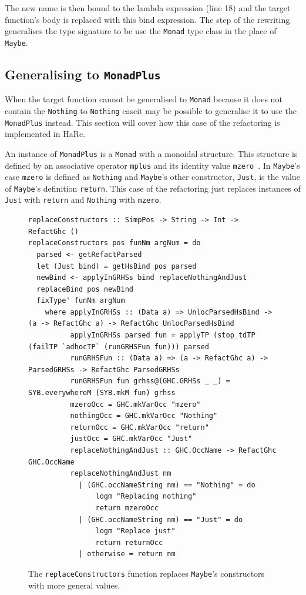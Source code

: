 The new name is then bound to the lambda expression (line 18) and the target function's body is replaced with this bind expression. The step of the rewriting generalises the type signature to be use the \texttt{Monad} type class in the place of \texttt{Maybe}.

\subsection{Generalising to \texttt{MonadPlus}}

When the target function cannot be generalised to \texttt{Monad} because it does not contain the \texttt{Nothing} to \texttt{Nothing} case\DIFaddbegin \DIFadd{, }\DIFaddend it may be possible to generalise it to use the \texttt{MonadPlus} \DIFdelbegin {}\DIFdelend \DIFaddbegin {}\DIFaddend instead. This section will cover how this case of the refactoring is implemented in HaRe.

An instance of \texttt{MonadPlus} is a \texttt{Monad} with a monoidal structure.
This structure is defined by an associative operator \texttt{mplus} and its identity value \texttt{mzero}~\citep{typeclassopedia}. 
In \texttt{Maybe}'s case \texttt{mzero} is defined as \texttt{Nothing} and \texttt{Maybe}'s other constructor, \texttt{Just}, is the value of \texttt{Maybe}'s definition \texttt{return}.
This case of the refactoring just replaces instances of \texttt{Just} with \texttt{return} and \texttt{Nothing} with \texttt{mzero}. 

\begin{figure}[t]
\begin{lstlisting}
replaceConstructors :: SimpPos -> String -> Int -> RefactGhc ()
replaceConstructors pos funNm argNum = do
  parsed <- getRefactParsed
  let (Just bind) = getHsBind pos parsed
  newBind <- applyInGRHSs bind replaceNothingAndJust
  replaceBind pos newBind
  fixType' funNm argNum
    where applyInGRHSs :: (Data a) => UnlocParsedHsBind -> (a -> RefactGhc a) -> RefactGhc UnlocParsedHsBind
          applyInGRHSs parsed fun = applyTP (stop_tdTP (failTP `adhocTP` (runGRHSFun fun))) parsed
          runGRHSFun :: (Data a) => (a -> RefactGhc a) -> ParsedGRHSs -> RefactGhc ParsedGRHSs
          runGRHSFun fun grhss@(GHC.GRHSs _ _) = SYB.everywhereM (SYB.mkM fun) grhss
          mzeroOcc = GHC.mkVarOcc "mzero"
          nothingOcc = GHC.mkVarOcc "Nothing"
          returnOcc = GHC.mkVarOcc "return"
          justOcc = GHC.mkVarOcc "Just"
          replaceNothingAndJust :: GHC.OccName -> RefactGhc GHC.OccName
          replaceNothingAndJust nm
            | (GHC.occNameString nm) == "Nothing" = do
                logm "Replacing nothing"
                return mzeroOcc
            | (GHC.occNameString nm) == "Just" = do
                logm "Replace just"
                return returnOcc            
            | otherwise = return nm
\end{lstlisting}
\caption{The \texttt{replaceConstructors} function replaces \texttt{Maybe}'s constructors with more general values.}
\label{replaceConstructors}
\end{figure}

